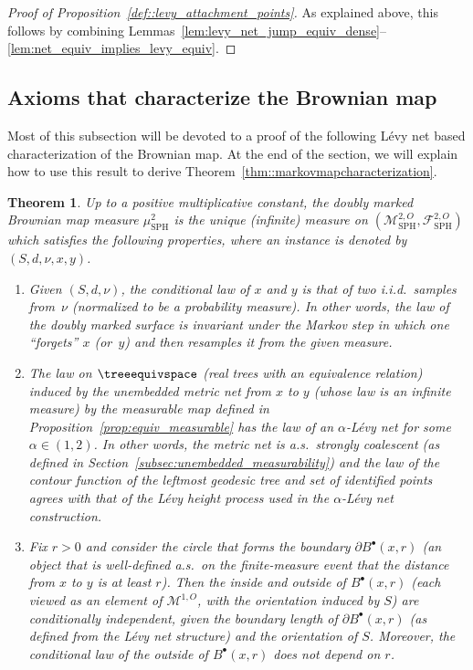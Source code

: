\documentclass[JEP,XML,SOM,Unicode]{cedram}
\let\mathcal\mathscr
\newcommand{\sbullet}{{\scriptscriptstyle\bullet}}
\theoremstyle{plain}
\newtheorem{theorem}{Theorem}
\numberwithin{theorem}{section}
\theoremstyle{definition}
\newcommand\gmsspace{{\mathcal M}_{\mathrm{SPH}}}
\newcommand\mmspace{{\mathcal M}}
\newcommand{\mmsigmaspho}{{\mathcal F}_{\mathrm{SPH}}^{2,O}}
\newcommand{\mustwo}{\mu_{\mathrm{SPH}}^2}
\newcommand{\fb}[2]{B^\sbullet(#1,#2)}
\begin{document}
\begin{proof}[Proof of Proposition~\ref{def::levy_attachment_points}]
As explained above, this follows by combining Lemmas~\ref{lem:levy_net_jump_equiv_dense}--\ref{lem:net_equiv_implies_levy_equiv}.
\end{proof}

\subsection{Axioms that characterize the Brownian map}
\label{subsec::axiomsforbrownianmap}

Most of this subsection will be devoted to a proof of the following Lévy net based characterization of the Brownian map. At the end of the section, we will explain how to use this result to derive Theorem~\ref{thm::markovmapcharacterization}.

\begin{theorem}
\label{thm::levynetbasedcharacterization}
Up to a positive multiplicative constant, the doubly marked Brownian map measure $\mustwo$ is the unique (infinite) measure on $(\gmsspace^{2,O}, \mmsigmaspho)$ which satisfies the following properties, where an instance is denoted by $(S,d,\nu,x,y)$.
\begin{enumerate}
\item Given $(S,d,\nu)$, the conditional law of $x$ and $y$ is that of two i.i.d.\ samples from~$\nu$ (normalized to be a probability measure). In other words, the law of the doubly marked surface is invariant under the Markov step in which one ``forgets'' $x$ (or~$y$) and then resamples it from the given measure.
\item The law on $\treeequivspace$ (real trees with an equivalence relation) induced by the unembedded metric net from $x$ to $y$ (whose law is an infinite measure) by the measurable map defined in Proposition~\ref{prop:equiv_measurable} has the law of an $\alpha$-Lévy net for some $\alpha \in (1,2)$. In other words, the metric net is a.s.\ strongly coalescent (as defined in Section~\ref{subsec:unembedded_measurability}) and the law of the contour function of the leftmost geodesic tree and set of identified points agrees with that of the Lévy height process used in the $\alpha$-Lévy net construction.

\item Fix $r>0$ and consider the circle that forms the boundary $\partial \fb{x}{r}$ (an object that is well-defined a.s.\ on the finite-measure event that the distance from $x$ to $y$ is at least $r$). Then the inside and outside of $\fb{x}{r}$ (each viewed as an element of $\mmspace^{1,O}$, with the orientation induced by $S$) are conditionally independent, given the boundary length of $\partial \fb{x}{r}$ (as defined from the Lévy net structure) and the orientation of $S$. Moreover, the conditional law of the outside of $\fb{x}{r}$ does not depend on $r$.
\end{enumerate}
\end{theorem}
\end{document}
